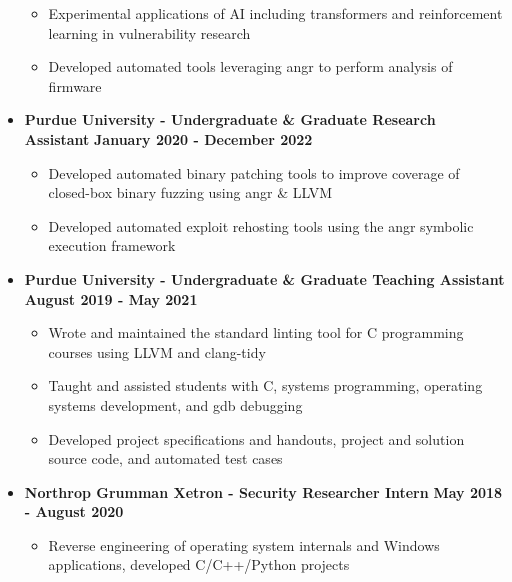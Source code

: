 \documentclass[letterpaper,10pt]{article}
\begin{document}
\begin{flushleft}
\begin{itemize}
\begin{itemize}
                \item Experimental applications of AI including transformers and reinforcement learning in vulnerability research \\
                \item Developed automated tools leveraging angr to perform analysis of firmware \\
            \end{itemize}
        \item \textbf{Purdue University - Undergraduate \& Graduate Research Assistant} \hfill \textbf{January 2020 - December 2022} \\
            \begin{itemize}
                \item Developed automated binary patching tools to improve coverage of closed-box binary fuzzing using angr \& LLVM \\
                \item Developed automated exploit rehosting tools using the angr symbolic execution framework \\
            \end{itemize}
        \item \textbf{Purdue University - Undergraduate \& Graduate Teaching Assistant} \hfill \textbf{August 2019 - May 2021} \\
            \begin{itemize}
                \item Wrote and maintained the standard linting tool for C programming courses using LLVM and clang-tidy \\
                \item Taught and assisted students with C, systems programming, operating systems development, and gdb debugging \\
                \item Developed project specifications and handouts, project and solution source code, and automated test cases \\
            \end{itemize}
    		\item \textbf{Northrop Grumman Xetron - Security Researcher Intern} \hfill \textbf{May 2018 - August 2020} \\
    			\begin{itemize}
                \item Reverse engineering of operating system internals and Windows applications, developed C/C++/Python projects \\

\end{itemize}
\end{itemize}
\end{flushleft}
\end{document}
